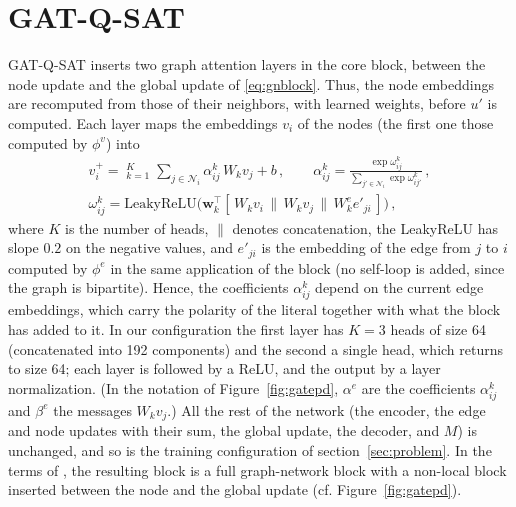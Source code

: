 \documentclass[11pt,a4paper]{article}
\begin{document}
\section{GAT-Q-SAT}\label{sec:gat}

GAT-Q-SAT inserts two graph attention layers \cite{Velickovic2018} in the core
block, between the node update and the global update of \eqref{eq:gnblock}.
Thus, the node embeddings are recomputed from those of their neighbors, with
learned weights, before $u'$ is computed. Each layer maps the embeddings $v_i$
of the nodes (the first one those computed by $\phi^v$) into
\begin{equation}\label{eq:gat}
  \begin{gathered}
  v_i^{+} = \mathop{\Big\|}_{k=1}^{K} \sum_{j \in \mathcal N_i} \alpha^k_{ij}\, W_k v_j + b \, ,
  \qquad
  \alpha^k_{ij} = \frac{\exp \omega^k_{ij}}{\sum_{j' \in \mathcal N_i} \exp \omega^k_{ij'}} \, ,
  \\
  \omega^k_{ij} = \mathrm{LeakyReLU}\big(\mathbf w_k^{\!\top}
            [\,W_k v_i \,\|\, W_k v_j \,\|\, W^e_k e'_{ji}\,]\big) \, ,
  \end{gathered}
\end{equation}
where $K$ is the number of heads, $\|$ denotes concatenation, the LeakyReLU has
slope $0.2$ on the negative values, and $e'_{ji}$ is the embedding of the edge
from $j$ to $i$ computed by $\phi^e$ in the same application of the block (no
self-loop is added, since the graph is bipartite). Hence, the coefficients
$\alpha^k_{ij}$ depend on the current edge embeddings, which carry the polarity
of the literal together with what the block has added to it. In our
configuration the first layer has $K = 3$ heads of size 64 (concatenated into
192 components) and the second a single head, which returns to size 64; each
layer is followed by a ReLU, and the output by a layer normalization. (In the
notation of Figure~\ref{fig:gatepd}, $\alpha^e$ are the coefficients
$\alpha^k_{ij}$ and $\beta^e$ the messages $W_k v_j$.) All the rest of the
network (the encoder, the edge and node updates
with their sum, the global update, the decoder, and $M$) is unchanged, and so is
the training configuration of section~\ref{sec:problem}. In the terms of
\cite{Battaglia2018}, the resulting block is a full graph-network block with a
non-local block inserted between the node and the global update
(cf. Figure~\ref{fig:gatepd}).
\end{document}
